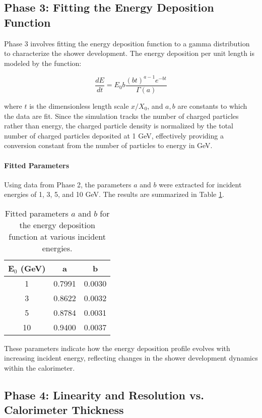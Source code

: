 \documentclass[twocolumn]{aastex631}
\begin{document}
\subsection{Phase 3: Fitting the Energy Deposition Function}

Phase 3 involves fitting the energy deposition function to a gamma distribution to characterize the shower development. The energy deposition per unit length is modeled by the function:

\[
\frac{dE}{dt} = E_0 b \frac{(bt)^{a-1}e^{-bt}}{\Gamma(a)}
\]

where \(t\) is the dimensionless length scale \(x/X_0\), and \(a, b\) are constants to which the data are fit. Since the simulation tracks the number of charged particles rather than energy, the charged particle density is normalized by the total number of charged particles deposited at 1 GeV, effectively providing a conversion constant from the number of particles to energy in GeV.

\paragraph{Fitted Parameters}

Using data from Phase 2, the parameters \(a\) and \(b\) were extracted for incident energies of 1, 3, 5, and 10 GeV. The results are summarized in Table \ref{tab:fitted_parameters}.

\begin{table}[htp]
    \centering
    \caption{Fitted parameters \(a\) and \(b\) for the energy deposition function at various incident energies.}
    \label{tab:fitted_parameters}
    \begin{tabular}{ccc}
        \hline
        \textbf{E\(_0\) (GeV)} & \textbf{a} & \textbf{b} \\
        \hline
        1 & 0.7991 & 0.0030 \\
        3 & 0.8622 & 0.0032 \\
        5 & 0.8784 & 0.0031 \\
        10 & 0.9400 & 0.0037 \\
        \hline
    \end{tabular}
\end{table}

These parameters indicate how the energy deposition profile evolves with increasing incident energy, reflecting changes in the shower development dynamics within the calorimeter.

\subsection{Phase 4: Linearity and Resolution vs. Calorimeter Thickness}
\end{document}
